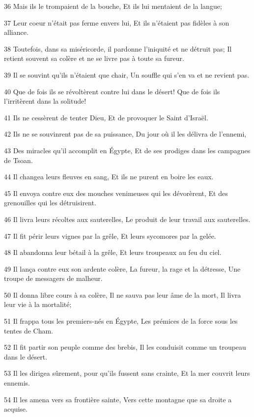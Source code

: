 \par 36 Mais ils le trompaient de la bouche, Et ils lui mentaient de la langue;
\par 37 Leur coeur n'était pas ferme envers lui, Et ils n'étaient pas fidèles à son alliance.
\par 38 Toutefois, dans sa miséricorde, il pardonne l'iniquité et ne détruit pas; Il retient souvent sa colère et ne se livre pas à toute sa fureur.
\par 39 Il se souvint qu'ils n'étaient que chair, Un souffle qui s'en va et ne revient pas.
\par 40 Que de fois ils se révoltèrent contre lui dans le désert! Que de fois ils l'irritèrent dans la solitude!
\par 41 Ils ne cessèrent de tenter Dieu, Et de provoquer le Saint d'Israël.
\par 42 Ils ne se souvinrent pas de sa puissance, Du jour où il les délivra de l'ennemi,
\par 43 Des miracles qu'il accomplit en Égypte, Et de ses prodiges dans les campagnes de Tsoan.
\par 44 Il changea leurs fleuves en sang, Et ils ne purent en boire les eaux.
\par 45 Il envoya contre eux des mouches venimeuses qui les dévorèrent, Et des grenouilles qui les détruisirent.
\par 46 Il livra leurs récoltes aux sauterelles, Le produit de leur travail aux sauterelles.
\par 47 Il fit périr leurs vignes par la grêle, Et leurs sycomores par la gelée.
\par 48 Il abandonna leur bétail à la grêle, Et leurs troupeaux au feu du ciel.
\par 49 Il lança contre eux son ardente colère, La fureur, la rage et la détresse, Une troupe de messagers de malheur.
\par 50 Il donna libre cours à sa colère, Il ne sauva pas leur âme de la mort, Il livra leur vie à la mortalité;
\par 51 Il frappa tous les premiers-nés en Égypte, Les prémices de la force sous les tentes de Cham.
\par 52 Il fit partir son peuple comme des brebis, Il les conduisit comme un troupeau dans le désert.
\par 53 Il les dirigea sûrement, pour qu'ils fussent sans crainte, Et la mer couvrit leurs ennemis.
\par 54 Il les amena vers sa frontière sainte, Vers cette montagne que sa droite a acquise.
